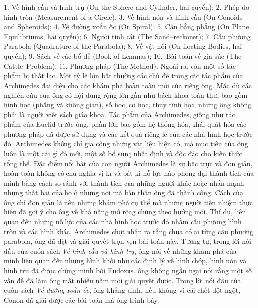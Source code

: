\begin{multicols}{2}
	\vskip 0.1cm
	$1.$ Về hình cầu và hình trụ (On the Sphere and Cylinder, hai quyển);
	\vskip 0.1cm
	$2.$ Phép đo hình tròn (Measurement of a Circle); 
	\vskip 0.1cm
	$3.$ Về hình nón và hình cầu (On Conoids and Spheroids); 
	\vskip 0.1cm
	$4.$ Về đường xoắn ốc (On Spiral);
	\vskip 0.1cm
	$5.$ Cân bằng phẳng (On Plane Equilibriums, hai quyển);
	\vskip 0.1cm
	$6.$ Người tính cát (The Sand--reckoner);
	\vskip 0.1cm
	$7.$ Cầu phương Parabola (Quadrature of the Parabola);
	\vskip 0.1cm
	$8.$ Về vật nổi (On floating Bodies, hai quyển); 
	\vskip 0.1cm
	$9.$ Sách về các bổ đề (Book of Lemmas);
	\vskip 0.1cm
	$10.$~Bài toán về gia súc (The Cattle--Problem). 
	\vskip 0.1cm
	$11.$ Phương pháp (The Method).
	\vskip 0.1cm
	Ngoài ra, còn một số tác phẩm bị thất lạc.
	\vskip 0.1cm
	Một tỷ lệ lớn bất thường các chủ đề trong các tác phẩm của Archimedes đại diện cho các khám phá hoàn toàn mới của riêng ông. Mặc dù các nghiên cứu của ông có nội dung rộng lớn gần như bách khoa toàn thư, bao gồm hình học (phẳng và không gian), số học, cơ học, thủy tĩnh học, nhưng ông không phải là người viết sách giáo khoa. Tác phẩm của Archimedes, giống như tác phẩm của Euclid trước ông, phần lớn bao gồm hệ thống hóa, khái quát hóa các phương pháp đã được sử dụng và các kết quả riêng lẻ của các nhà hình học trước đó. Archimedes không chỉ gia công những vật liệu hiện có, mà mục tiêu của ông luôn là một cái gì đó mới, một số bổ sung nhất định và độc đáo cho kiến thức tổng thể. 
	\vskip 0.1cm
	Đặc điểm nổi bật của con người Archimedes là sự bộc trực và đơn giản, hoàn toàn không có chủ nghĩa vị kỉ và bất kì nỗ lực nào phóng đại thành tích của mình bằng cách so sánh với thành tích của những người khác hoặc nhấn mạnh những thất bại của họ ở những nơi mà bản thân ông đã thành công. Cách của ông chỉ đơn giản là nêu những khám phá cụ thể mà những người tiền nhiệm thực hiện đã gợi ý cho ông về khả năng mở rộng chúng theo hướng mới. Thí dụ, liên quan đến những nỗ lực của các nhà hình học trước đó nhằm cầu phương hình tròn và các hình khác, Archimedes chợt nhận ra rằng chưa có ai từng cầu phương parabola, ông đã đặt và giải quyết trọn vẹn bài toán này. Tương tự, trong lời nói đầu của cuốn sách \textit{Về hình cầu và hình trụ}, ông nói về những khám phá của mình liên quan đến những hình khối như các định lý về hình chóp, hình nón và hình trụ đã được chứng minh bởi Eudoxus.  ông không ngần ngại nói rằng một số vấn đề đã làm ông mất nhiều năm mới giải quyết được. Trong lời nói đầu của cuốn sách \textit{Về đường xoắn ốc}, ông khẳng định, nếu không vì cái chết đột ngột, Conon đã giải được các bài toán mà ông trình bày. 

\end{multicols}
